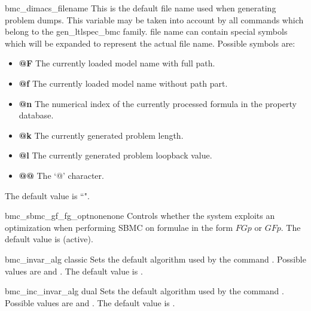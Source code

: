 \begin{nusmvVar} {bmc\_dimacs\_filename}{}{}
This is the default file name used when generating \dimacs problem
dumps. This variable may be taken into account by all commands which
belong to the gen\_ltlspec\_bmc family.  \dimacs file name can contain
special symbols which will be expanded to represent the actual file
name. Possible symbols are:

\begin{itemize}
\item {\bf @F}
The currently loaded model name with full path.
\item {\bf @f}
The currently loaded model name without path part.
\item {\bf @n}
The numerical index of the currently processed formula in the property
database.
\item {\bf @k}
The currently generated problem length.
\item {\bf @l}
The currently generated problem loopback value.
\item {\bf @@}
The `@' character.
\end{itemize}

The default value is ``".
\end{nusmvVar}

\begin{nusmvVar} {bmc\_sbmc\_gf\_fg\_opt}{none}{none}
Controls whether the system exploits an optimization when performing
SBMC on formulae in the form $F G p$ or $G F p$. The default value is
 (active).
\end{nusmvVar}








\label{bmc::dual}

\begin{nusmvVar} {bmc\_invar\_alg}
{}{classic}
Sets the default algorithm used by the command .
Possible values are  and .
The default value is .
\end{nusmvVar}

\begin{nusmvVar} {bmc\_inc\_invar\_alg}
{}{dual}
Sets the default algorithm used by the command .
Possible values are  and .
The default value is .
\end{nusmvVar}

